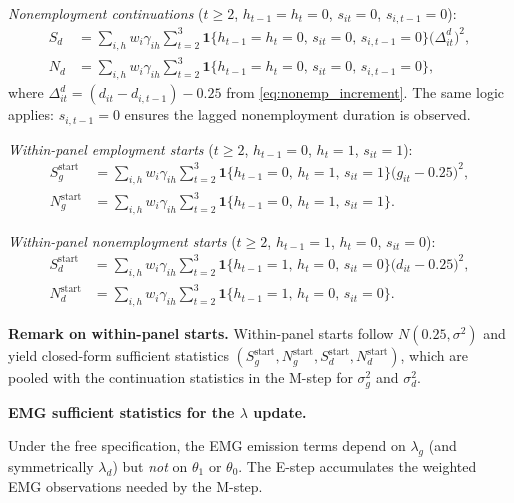 \documentclass[12pt]{article}
\begin{document}
\emph{Nonemployment continuations} (\(t\ge 2\), \(h_{t-1}=h_t=0\), \(s_{it}=0\), \(s_{i,t-1}=0\)):
\begin{align}
S_d &= \sum_{i,h} w_i\gamma_{ih}\sum_{t=2}^3\mathbf{1}\{h_{t-1}=h_t=0,\,s_{it}=0,\,s_{i,t-1}=0\} \big(\Delta^d_{it}\big)^2,\nonumber\\
N_d &= \sum_{i,h} w_i\gamma_{ih}\sum_{t=2}^3\mathbf{1}\{h_{t-1}=h_t=0,\,s_{it}=0,\,s_{i,t-1}=0\},
\label{eq:suff_gauss_d}
\end{align}
where \(\Delta^d_{it} = (d_{it}-d_{i,t-1}) - 0.25\) from \eqref{eq:nonemp_increment}. The same logic applies: \(s_{i,t-1}=0\) ensures the lagged nonemployment duration is observed.

\emph{Within-panel employment starts} (\(t\ge 2\), \(h_{t-1}=0\), \(h_t=1\), \(s_{it}=1\)):
\begin{align}
S_g^{\mathrm{start}} &= \sum_{i,h} w_i\gamma_{ih}\sum_{t=2}^3\mathbf{1}\{h_{t-1}=0,\,h_t=1,\,s_{it}=1\}\big(g_{it}-0.25\big)^2,\nonumber\\
N_g^{\mathrm{start}} &= \sum_{i,h} w_i\gamma_{ih}\sum_{t=2}^3\mathbf{1}\{h_{t-1}=0,\,h_t=1,\,s_{it}=1\}.
\label{eq:suff_gauss_g_start}
\end{align}

\emph{Within-panel nonemployment starts} (\(t\ge 2\), \(h_{t-1}=1\), \(h_t=0\), \(s_{it}=0\)):
\begin{align}
S_d^{\mathrm{start}} &= \sum_{i,h} w_i\gamma_{ih}\sum_{t=2}^3\mathbf{1}\{h_{t-1}=1,\,h_t=0,\,s_{it}=0\}\big(d_{it}-0.25\big)^2,\nonumber\\
N_d^{\mathrm{start}} &= \sum_{i,h} w_i\gamma_{ih}\sum_{t=2}^3\mathbf{1}\{h_{t-1}=1,\,h_t=0,\,s_{it}=0\}.
\label{eq:suff_gauss_d_start}
\end{align}

\textbf{Remark on within-panel starts.} Within-panel starts follow \(N(0.25, \sigma^2)\) and yield closed-form sufficient statistics \((S_g^{\mathrm{start}}, N_g^{\mathrm{start}}, S_d^{\mathrm{start}}, N_d^{\mathrm{start}})\), which are pooled with the continuation statistics in the M-step for \(\sigma_g^2\) and \(\sigma_d^2\).

\textbf{EMG sufficient statistics for the \(\lambda\) update.}

Under the free specification, the EMG emission terms depend on \(\lambda_g\) (and symmetrically \(\lambda_d\)) but \emph{not} on \(\theta_1\) or \(\theta_0\). The E-step accumulates the weighted EMG observations needed by the M-step.
\end{document}
